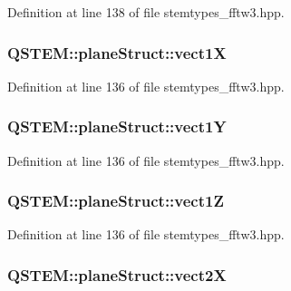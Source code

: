 Definition at line 138 of file stemtypes\-\_\-fftw3.\-hpp.

\hypertarget{struct_q_s_t_e_m_1_1plane_struct_aa86cc6f57f738af42daaf8f3ea11f8dd}{
\subsubsection[{vect1\-X}]{ Q\-S\-T\-E\-M\-::plane\-Struct\-::vect1\-X}}\label{struct_q_s_t_e_m_1_1plane_struct_aa86cc6f57f738af42daaf8f3ea11f8dd}


Definition at line 136 of file stemtypes\-\_\-fftw3.\-hpp.

\hypertarget{struct_q_s_t_e_m_1_1plane_struct_a39d87483fd7812e56e4af6d16452cec7}{
\subsubsection[{vect1\-Y}]{ Q\-S\-T\-E\-M\-::plane\-Struct\-::vect1\-Y}}\label{struct_q_s_t_e_m_1_1plane_struct_a39d87483fd7812e56e4af6d16452cec7}


Definition at line 136 of file stemtypes\-\_\-fftw3.\-hpp.

\hypertarget{struct_q_s_t_e_m_1_1plane_struct_a1cd9d66faa16a0eaa60d9f65641ab1fc}{
\subsubsection[{vect1\-Z}]{ Q\-S\-T\-E\-M\-::plane\-Struct\-::vect1\-Z}}\label{struct_q_s_t_e_m_1_1plane_struct_a1cd9d66faa16a0eaa60d9f65641ab1fc}


Definition at line 136 of file stemtypes\-\_\-fftw3.\-hpp.

\hypertarget{struct_q_s_t_e_m_1_1plane_struct_aeafa46b7443b448d08d2392835d97b04}{
\subsubsection[{vect2\-X}]{ Q\-S\-T\-E\-M\-::plane\-Struct\-::vect2\-X}}\label{struct_q_s_t_e_m_1_1plane_struct_aeafa46b7443b448d08d2392835d97b04}


